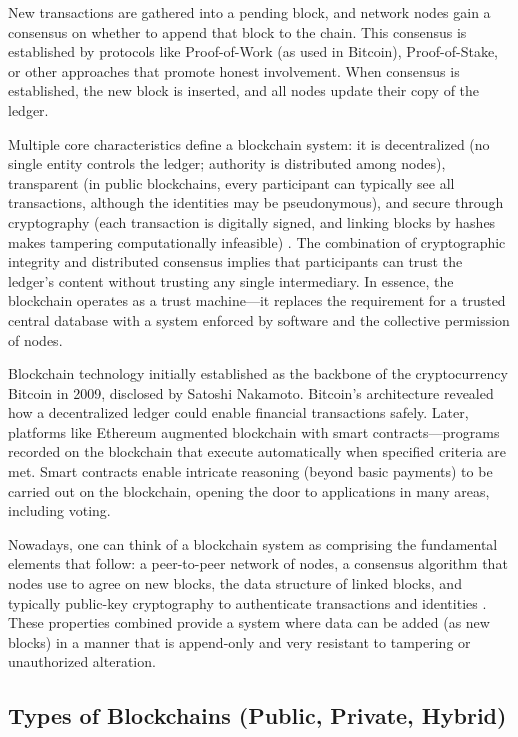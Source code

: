 \documentclass[a4paper,10pt]{report}
\begin{document}
  New transactions are gathered into a pending block, and network nodes gain a consensus on whether to append that block to the chain.   This consensus is established by protocols like Proof-of-Work (as used in Bitcoin), Proof-of-Stake, or other approaches that promote honest involvement.   When consensus is established, the new block is inserted, and all nodes update their copy of the ledger.

  Multiple core characteristics define a blockchain system: it is decentralized (no single entity controls the ledger; authority is distributed among nodes), transparent (in public blockchains, every participant can typically see all transactions, although the identities may be pseudonymous), and secure through cryptography (each transaction is digitally signed, and linking blocks by hashes makes tampering computationally infeasible) \cite{linkedin2022}.   The combination of cryptographic integrity and distributed consensus implies that participants can trust the ledger’s content without trusting any single intermediary.   In essence, the blockchain operates as a trust machine—it replaces the requirement for a trusted central database with a system enforced by software and the collective permission of nodes.

  Blockchain technology initially established as the backbone of the cryptocurrency Bitcoin in 2009, disclosed by Satoshi Nakamoto.   Bitcoin’s architecture revealed how a decentralized ledger could enable financial transactions safely.   Later, platforms like Ethereum augmented blockchain with smart contracts—programs recorded on the blockchain that execute automatically when specified criteria are met.   Smart contracts enable intricate reasoning (beyond basic payments) to be carried out on the blockchain, opening the door to applications in many areas, including voting.

  Nowadays, one can think of a blockchain system as comprising the fundamental elements that follow: a peer-to-peer network of nodes, a consensus algorithm that nodes use to agree on new blocks, the data structure of linked blocks, and typically public-key cryptography to authenticate transactions and identities \cite{pmc2020}.   These properties combined provide a system where data can be added (as new blocks) in a manner that is append-only and very resistant to tampering or unauthorized alteration.

\subsection{Types of Blockchains (Public, Private, Hybrid)}
\end{document}
